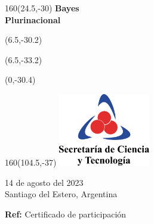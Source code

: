 \documentclass[a4paper,11pt]{letter}
\begin{document}
\begin{letter}

\begin{textblock}{160}(24.5,-30)
\noindent \Huge\textbf{Bayes \\ Plurinacional \\}
\end{textblock}
\begin{textblock}{80}(6.5,-30.2)
\LARGE  {}
\end{textblock}
\begin{textblock}{80}(6.5,-33.2)
\LARGE {}
\end{textblock}
\begin{textblock}{80}(0,-30.4)
\LARGE {\scalebox{2.505}{$($}}
\end{textblock}
\begin{textblock}{160}(104.5,-37)
\includegraphics[width=4cm]{logo-secretaria.png}
\end{textblock}




\vspace{-1cm}

\begin{flushright}
14 de agosto del 2023  \\
Santiago del Estero, Argentina \\
\end{flushright}

\vspace{1cm}
\noindent

\textbf{Ref:} Certificado de participación\\

\vspace{1cm}


\end{letter}
\end{document}
